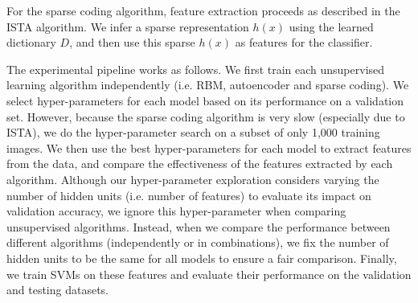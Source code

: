 \documentclass{article} %
\begin{document}
For the sparse coding algorithm, feature extraction proceeds as described in the ISTA algorithm. We infer a sparse representation $h(x)$ using the learned dictionary $D$, and then use this sparse $h(x)$ as features for the classifier.

The experimental pipeline works as follows. We first train each unsupervised learning algorithm independently (i.e. RBM, autoencoder and sparse coding). We select hyper-parameters for each model based on its performance on a validation set. However, because the sparse coding algorithm is very slow (especially due to ISTA), we do the hyper-parameter search on a subset of only 1,000 training images. We then use the best hyper-parameters for each model to extract features from the data, and compare the effectiveness of the features extracted by each algorithm. Although our hyper-parameter exploration considers varying the number of hidden units (i.e. number of features) to evaluate its impact on validation accuracy, we ignore this hyper-parameter when comparing unsupervised algorithms. Instead, when we compare the performance between different algorithms (independently or in combinations), we fix the number of hidden units to be the same for all models to ensure a fair comparison. Finally, we train SVMs on these features and evaluate their performance on the validation and testing datasets.
\end{document}
